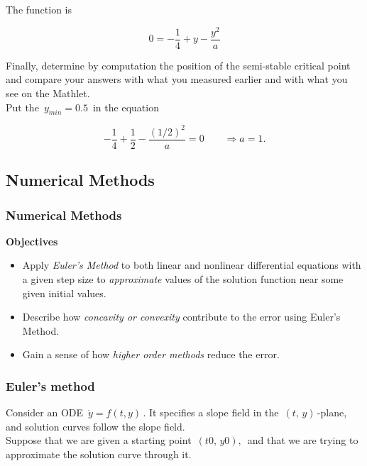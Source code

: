 The function is

\begin{equation*}
  0 = -\frac{1}{4} + y - \frac{y^2}{a} 
\end{equation*}

Finally, determine by computation the position of the semi-stable critical point
and compare your answers with what you measured earlier and with what you see on the Mathlet. \\

Put the  $\, y_{min} = 0.5 \,$ in the equation

\begin{equation*}
  -\frac{1}{4} + \frac{1}{2} - \frac{(1/2)^2}{a}  = 0
  \qquad \Rightarrow a = 1. 
\end{equation*}

\clearpage

\subsection{Numerical Methods}
\subsubsection{Numerical Methods}

\textbf{Objectives}

\begin{itemize}
\item Apply \emph{\color{blue}Euler's Method} to both linear
  and nonlinear differential equations
  with a given step size to \emph{approximate} values of
  the solution function near some given initial values.
\item Describe how \emph{\color{blue}concavity or convexity}
  contribute to the error using Euler's Method.
\item Gain a sense of how \emph{\color{blue}higher order methods} reduce the error.
\end{itemize}

\clearpage

\subsubsection{Euler's method}

Consider an ODE $\, \dot y = f(t,y)\,$.
It specifies a slope field in the $\,(t,\,y)\,$-plane, and solution curves follow the slope field. \\

Suppose that we are given a starting point $\,(t0,\,y0),\,$
and that we are trying to approximate the solution curve through it.

